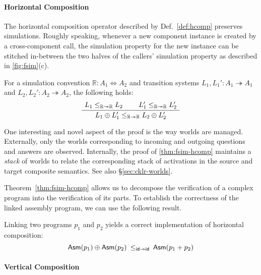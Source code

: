 \documentclass[sigplan,screen]{acmart}
\begin{document}

\paragraph{Horizontal Composition} %

The horizontal composition operator
described by Def.~\ref{def:hcomp}
preserves simulations.
Roughly speaking,
whenever a new component instance is created
by a cross-component call,
the simulation property for the new instance
can be stitched in-between
the two halves of the callers' simulation property
as described in \autoref{fig:fsim}(c).

\begin{theorem} \label{thm:fsim-hcomp} %
For a simulation convention
$\mathbb{R} : A_1 \Leftrightarrow A_2$
and transition systems
$L_1, L_1' : A_1 \twoheadrightarrow A_1$ and
$L_2, L_2' : A_2 \twoheadrightarrow A_2$,
the following holds:
\[
    \AxiomC{$L_1 \le_{\mathbb{R} \twoheadrightarrow \mathbb{R}} L_2$}
    \AxiomC{$L_1' \le_{\mathbb{R} \twoheadrightarrow \mathbb{R}} L_2'$}
    \BinaryInfC{$L_1 \oplus L_1'
      \le_{\mathbb{R} \twoheadrightarrow \mathbb{R}}
      L_2 \oplus L_2'$}
    \DisplayProof
\]
\end{theorem}

One interesting and novel aspect of the proof
is the way worlds are managed.
Externally,
only the worlds corresponding to incoming and outgoing
questions and answers are observed.
Internally,
the proof of \autoref{thm:fsim-hcomp}
maintains a \emph{stack} of
worlds
to relate the corresponding stack of activations
in the source and target composite semantics.
See also \S\ref{sec:cklr-worlds}.

Theorem~\ref{thm:fsim-hcomp}
allows us to decompose the verification of a complex program
into the verification of its parts.
To establish the correctness of the linked assembly program,
we can use the following result.

\begin{theorem} \label{thm:asmlinking} %
Linking two  programs $p_1$ and $p_2$
yields a correct implementation of
horizontal composition:
\[
       \mathsf{Asm} (p_1) \oplus  \mathsf{Asm} (p_2)
      \:\le_{ \mathsf{id}  \twoheadrightarrow  \mathsf{id} }\:
       \mathsf{Asm} (p_1 + p_2)
\]
\end{theorem}


\paragraph{Vertical Composition} %
\end{document}
